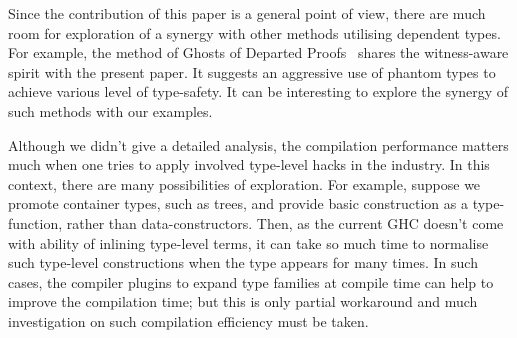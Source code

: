 \documentclass[demotion-paper.tex]{subfiles}
\begin{document}
Since the contribution of this paper is a general point of view, there are much room for exploration of a synergy with other methods utilising dependent types.
For example, the method of Ghosts of Departed Proofs~\cite{Noonan:2018aa} shares the witness-aware spirit with the present paper.
It suggests an aggressive use of phantom types to achieve various level of type-safety.
It can be interesting to explore the synergy of such methods with our examples.

Although we didn't give a detailed analysis, the compilation performance matters much when one tries to apply involved type-level hacks in the industry.
In this context, there are many possibilities of exploration.
For example, suppose we promote container types, such as trees, and provide basic construction as a type-function, rather than data-constructors.
Then, as the current GHC doesn't come with ability of inlining type-level terms, it can take so much time to normalise such type-level constructions when the type appears for many times.
In such cases, the compiler plugins to expand type families at compile time can help to improve the compilation time; but this is only partial workaround and much investigation on such compilation efficiency must be taken.
\end{document}
